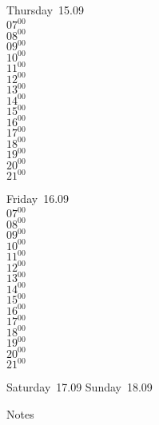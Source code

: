 \documentclass[11pt,a4paper]{book}\usepackage[]{graphicx}\usepackage[]{color}
\begin{document}
\clearpage
\begin{headerbox}
\end{headerbox}
\begin{weekdaybox}
  Thursday~15.09\\
  { 
  \vfill
  $07^{00}$\\
$08^{00}$\\
$09^{00}$\\
$10^{00}$\\
$11^{00}$\\
$12^{00}$\\
$13^{00}$\\
$14^{00}$\\
$15^{00}$\\
$16^{00}$\\
$17^{00}$\\
$18^{00}$\\
$19^{00}$\\
$20^{00}$\\
$21^{00}$\\
  }
\end{weekdaybox} 
\begin{weekdaybox}
  Friday~16.09\\
  { 
  \vfill
  $07^{00}$\\
$08^{00}$\\
$09^{00}$\\
$10^{00}$\\
$11^{00}$\\
$12^{00}$\\
$13^{00}$\\
$14^{00}$\\
$15^{00}$\\
$16^{00}$\\
$17^{00}$\\
$18^{00}$\\
$19^{00}$\\
$20^{00}$\\
$21^{00}$\\
  }
\end{weekdaybox}
\begin{weekendbox}
  Saturday~17.09
  \tcblower
  Sunday~18.09
\end{weekendbox} %
\begin{notebox}
  Notes
\end{notebox}
\clearpage
\end{document}
